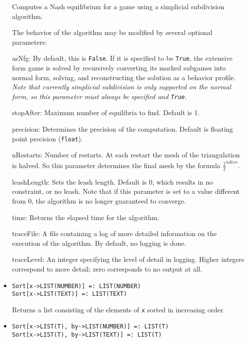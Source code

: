 \begin{itemize}
\bd
Computes a Nash equilibrium for a game using a simplicial subdivision
algorithm. 

The behavior of the algorithm may be modified by several optional
parameters:

\bd
\item
[asNfg:] By default, this is \verb+False+.  If it is specified to be
\verb+True+, the extensive form game is solved by recursively converting
its marked subgames into normal form, solving, and reconstructing the
solution as a behavior profile.  {\it Note that currently simplicial
subdivision is only supported on the normal form, so this parameter
must always be specified and {\tt True}.}
\item
[stopAfter:] Maximum number of equilibria to find. Default is 1.  
\item
[precision:] Determines the precision of the computation. Default is
floating point precision (\verb+float+). 
\item 
[nRestarts:] Number of restarts.  At each restart the mesh of the
triangulation is halved.  So this parameter determines the final mesh
by the formula $\frac{1}{2}^{ndivs}$.
\item
[leashLength:] Sets the leash length. Default is 0, which results in no
constraint, or no leash.  Note that if this parameter is set to a value
different from 0, the algorithm is no longer guaranteed to converge.
\item
[time:] Returns the elapsed time for the algorithm.
\item
[traceFile:] A file containing a log of more detailed information on the
execution of the algorithm.  By default, no logging is done.
\item
[traceLevel:] An integer specifying the level of detail in logging.
Higher integers correspond to more detail; zero corresponds to
no output at all.
\ed
\ed

\item{}
\protect \large \begin{verbatim}
Sort[x->LIST(NUMBER)] =: LIST(NUMBER)
Sort[x->LIST(TEXT)] =: LIST(TEXT)
\end{verbatim} \normalsize

\bd
Returns a list consisting of the elements of \verb+x+ sorted in
increasing order.
\ed

\item{}
\protect \large \begin{verbatim}
Sort[x->LIST(T), by->LIST(NUMBER)] =: LIST(T)
Sort[x->LIST(T), by->LIST(TEXT)] =: LIST(T)
\end{verbatim} \normalsize


\end{itemize}
